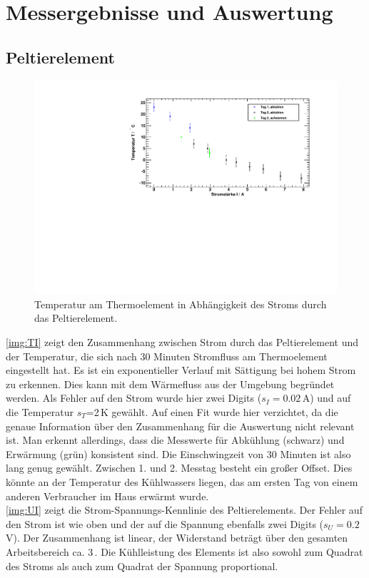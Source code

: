 \section{Messergebnisse und Auswertung}
\subsection{Peltierelement}

\begin{figure}[H]
\begin{center}
  \includegraphics[width=\textwidth]{../img/graph_T-I.pdf}
  \caption{Temperatur am Thermoelement
  in Abhängigkeit des Stroms durch das Peltierelement.}
  \label{img:TI}
\end{center}
\end{figure}

\autoref{img:TI} zeigt den Zusammenhang zwischen Strom durch das Peltierelement
und der Temperatur, die sich nach 30 Minuten Stromfluss am Thermoelement eingestellt hat.
Es ist ein exponentieller Verlauf mit Sättigung bei hohem Strom zu erkennen.
Dies kann mit dem Wärmefluss aus der Umgebung begründet werden.
Als Fehler auf den Strom wurde hier zwei Digits ($s_I=0.02$\,A) und auf die Temperatur $s_T$=2\,K gewählt.
Auf einen Fit wurde hier verzichtet, da die genaue Information über den Zusammenhang
für die Auswertung nicht relevant ist.
Man erkennt allerdings, dass die Messwerte für Abkühlung (schwarz) und Erwärmung (grün) konsistent sind.
Die Einschwingzeit von 30 Minuten ist also lang genug gewählt.
Zwischen 1. und 2. Messtag besteht ein großer Offset.
Dies könnte an der Temperatur des Kühlwassers liegen,
das am ersten Tag von einem anderen Verbraucher im Haus erwärmt wurde.\\
\autoref{img:UI} zeigt die Strom-Spannungs-Kennlinie des Peltierelements.
Der Fehler auf den Strom ist wie oben und der auf die Spannung ebenfalls zwei Digits ($s_U=0.2$\,V).
Der Zusammenhang ist linear, der Widerstand beträgt über den gesamten Arbeitsbereich ca. 3\,\textOmega.
Die Kühlleistung des Elements ist also sowohl zum Quadrat des Stroms als auch zum Quadrat der Spannung proportional.



